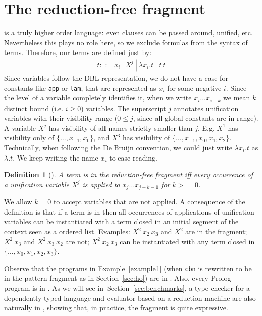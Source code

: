 \documentclass{llncs}
\newtheorem{mydef}{Definition}
\begin{document}
\section{The reduction-free fragment \rff{}}\label{sec:fragment}
\lp{} is a truly higher order language: even clauses can be
passed around, unified, etc. Nevertheless this plays no role here, so
we exclude formulas from the syntax of terms.
Therefore, our terms are defined just by:
\vspace{-0.5em}
$$\begin{array}{l}
   t ::= x_i ~|~ X^j ~|~ \lambda x_i.t ~|~ t~t
\end{array}$$
\vspace{-0.1em}
Since variables follow the DBL representation, we do not have a case
for constants like \verb+app+ or \verb+lam+, that are represented as $x_i$ for some negative $i$.
Since the
level of a variable completely identifies it, when we write
$x_i \ldots x_{i+k}$ we mean $k$ distinct bound (i.e. $i \geq 0$) variables.
The superscript $j$ annotates unification variables with their
visibility range ($0 \leq j$, since all global constants are in range).
A variable $X^j$ has visibility of all names strictly
smaller than $j$. E.g. $X^1$ has visibility only of $\{\ldots,x_{-1},x_0\}$, and $X^3$ has
visibility of $\{\ldots,x_{-1},x_0,x_1,x_2\}$. Technically, when following
the De Bruijn convention, we could just write $\lambda x_i.t$ as $\lambda.t$.
We keep writing the name $x_i$ to ease reading.

\begin{mydef}[\rff{}]
A term is in the reduction-free fragment \rff{} iff
every occurrence of a unification variable $X^j$ is applied to
$x_j \ldots x_{j+k-1}$ for $k >= 0$.
\end{mydef}

We allow $k=0$ to accept variables that are not applied. A consequence of
the definition is that if a term is in \rff{} then all occurrences of
applications of unification variables
can be instantiated with a term closed
in an initial segment of the \lp{} context seen as a ordered list.
Examples: $X^2~x_2~x_3$ and $X^2$ are in the fragment; $X^2~x_3$ and
$X^2~x_3~x_2$ are not; $X^2~x_2~x_3$ can be instantiated with any term
closed in $\{\ldots,x_0,x_1,x_2,x_3\}$.

Observe that the programs in Example~\ref{example1} (when \verb+cbn+ is
rewritten to be in the pattern fragment as in Section~\ref{sec:ho}) are in
\rff{}. Also, every Prolog program is in \rff{}. As we will see
in~Section~\ref{sec:benchmarks}, a
type-checker for a dependently typed language
and evaluator based on a reduction machine are also naturally in \rff{},
showing that, in practice, the fragment is quite expressive.
\end{document}
